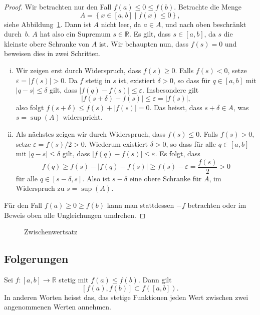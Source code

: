 \documentclass[../main.tex]{subfiles}
\begin{document}
\begin{proof}
  Wir betrachten nur den Fall $f(a) \leq 0 \leq f(b)$.
  Betrachte die Menge
  \[
    A = \left\{x \in [a, b] \mid f(x) \leq 0\right\},
  \]
  siehe Abbildung~\ref{fig:zwischen}.
  Dann ist $A$ nicht leer, da $a \in A$, und nach oben
  beschränkt durch~$b$.
  $A$ hat also ein Supremum $s \in \mathbb{R}$.
  Es gilt, dass $s \in [a,b]$, da $s$ die kleinste
  obere Schranke von $A$ ist.
  Wir behaupten nun, dass $f(s) = 0$ und beweisen
  dies in zwei Schritten.

  \begin{enumerate}[(i)]
    \item Wir zeigen erst durch Widerspruch, dass $f(s) \geq 0$.
      Falls $f(s) < 0$, setze
      $\varepsilon = |f(s)| > 0$. Da $f$ stetig in $s$ ist,
      existiert $\delta > 0$, so dass
      für $q \in [a, b]$
      mit $|q - s| \leq \delta$ gilt, dass
      $|f(q) - f(s)| \leq \varepsilon$.
      Insbesondere gilt
      \[
      |f(s + \delta) - f(s)| \leq \varepsilon = |f(s)|,
      \]
        also folgt
        $f(s + \delta) \leq f(s) + |f(s)| = 0$.
      Das heisst, dass $s + \delta \in A$, was
      $s = \sup(A)$ widerspricht.
    \item Als nächstes zeigen wir durch Widerspruch,
      dass $f(s) \leq 0$. 
      Falls $f(s) > 0$,
      setze $\varepsilon = f(s)/2 > 0$.
      Wiederum existiert $\delta > 0$, 
      so dass für alle $q \in [a, b]$ mit $|q- s| \leq \delta$ 
      gilt, dass
      $|f(q) - f(s)| \leq \varepsilon$.
      Es folgt, dass
      \[
        f(q) \geq f(s) - |f(q) - f(s)| \geq f(s) - \varepsilon = \frac{f(s)}{2}
        > 0
      \]
      für alle $q \in [s - \delta, s]$.
      Also ist $s - \delta$ eine obere Schranke für $A$,
      im Widerspruch zu $s = \sup(A)$.
  \end{enumerate}
  Für den Fall $f(a) \geq 0 \geq f(b)$ kann man
  stattdessen $-f$ betrachten
  oder im Beweis oben alle Ungleichungen umdrehen.
\end{proof}

\begin{figure}[htb]
  \centering
  
  \caption{Zwischenwertsatz}%
  \label{fig:zwischen}
\end{figure}

\subsection*{Folgerungen}
\begin{zwischenwertsatz}
  Sei $f \colon [a, b] \to \mathbb{R} $
  stetig mit $f(a) \leq f(b)$.
  Dann gilt 
  \[[f(a), f(b)] \subset f([a, b]).\]
  In anderen Worten heisst das, das stetige
  Funktionen jeden Wert zwischen
  zwei angenommenen Werten annehmen.
\end{zwischenwertsatz}
\end{document}
